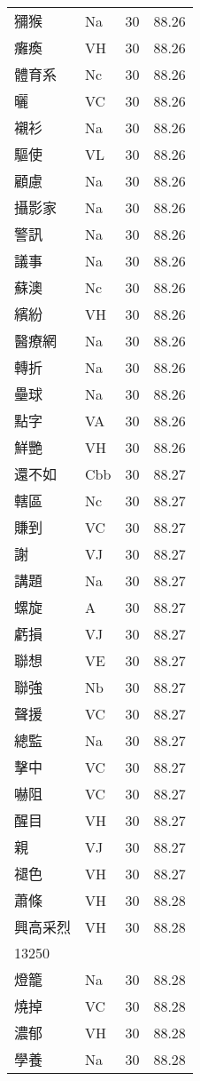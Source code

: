 \documentclass[twocolumn]{book}
\begin{document}
\begin{supertabular}{llrr}
獼猴 & Na & 30 &  88.26\\
癱瘓 & VH & 30 &  88.26\\
體育系 & Nc & 30 &  88.26\\
曬 & VC & 30 &  88.26\\
襯衫 & Na & 30 &  88.26\\
驅使 & VL & 30 &  88.26\\
顧慮 & Na & 30 &  88.26\\
攝影家 & Na & 30 &  88.26\\
警訊 & Na & 30 &  88.26\\
議事 & Na & 30 &  88.26\\
蘇澳 & Nc & 30 &  88.26\\
繽紛 & VH & 30 &  88.26\\
醫療網 & Na & 30 &  88.26\\
轉折 & Na & 30 &  88.26\\
壘球 & Na & 30 &  88.26\\
點字 & VA & 30 &  88.26\\
鮮艷 & VH & 30 &  88.26\\
還不如 & Cbb & 30 &  88.27\\
轄區 & Nc & 30 &  88.27\\
賺到 & VC & 30 &  88.27\\
謝 & VJ & 30 &  88.27\\
講題 & Na & 30 &  88.27\\
螺旋 & A & 30 &  88.27\\
虧損 & VJ & 30 &  88.27\\
聯想 & VE & 30 &  88.27\\
聯強 & Nb & 30 &  88.27\\
聲援 & VC & 30 &  88.27\\
總監 & Na & 30 &  88.27\\
擊中 & VC & 30 &  88.27\\
嚇阻 & VC & 30 &  88.27\\
醒目 & VH & 30 &  88.27\\
親 & VJ & 30 &  88.27\\
褪色 & VH & 30 &  88.27\\
蕭條 & VH & 30 &  88.28\\
興高采烈 & VH & 30 &  88.28\\
13250\\
燈籠 & Na & 30 &  88.28\\
燒掉 & VC & 30 &  88.28\\
濃郁 & VH & 30 &  88.28\\
學養 & Na & 30 &  88.28\\

\end{supertabular}
\end{document}
